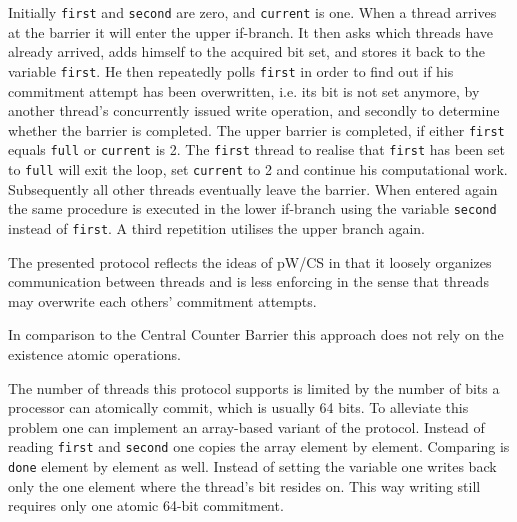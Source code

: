 \documentclass[a4paper, 10pt]{article}
\begin{document}
Initially \texttt{first} and \texttt{second} are zero, and \texttt{current} is one. When a thread arrives at the barrier it will enter the upper if-branch. It then asks which threads have already arrived, adds himself to the acquired bit set, and stores it back to the variable \texttt{first}.
He then repeatedly polls \texttt{first} in order to find out if his commitment attempt has been overwritten, i.e. its bit is not set anymore, by another thread's concurrently issued write operation, and secondly to determine whether the barrier is completed. The upper barrier is completed, if either \texttt{first} equals \texttt{full} or \texttt{current} is 2. The \texttt{first} thread to realise that \texttt{first} has been set to \texttt{full} will exit the loop, set \texttt{current} to 2 and continue his computational work. Subsequently all other threads eventually leave the barrier.
When entered again the same procedure is executed in the lower if-branch using the variable \texttt{second} instead of \texttt{first}. A third repetition utilises the upper branch again.

The presented protocol reflects the ideas of pW/CS in that it loosely organizes communication between threads and is less enforcing in the sense that threads may overwrite each others' commitment attempts.

In comparison to the Central Counter Barrier this approach does not rely on the existence atomic operations.

The number of threads this protocol supports is limited by the number of bits a processor can atomically commit, which is usually 64 bits. To alleviate this problem one can implement an array-based variant of the protocol. Instead of reading \texttt{first} and \texttt{second} one copies the array element by element. Comparing is \texttt{done} element by element as well. Instead of setting the variable one writes back only the one element where the thread's bit resides on. This way writing still requires only one atomic 64-bit commitment.

\end{document}
